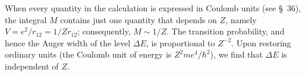 When every quantity in the calculation is expressed in Coulomb units (see \S~36), the integral $M$ contains just one quantity that depends on $Z$, namely $V=e^2/r_{12}=1/Zr_{12}$; consequently, $M\sim1/Z$. The transition probability, and hence the Auger width of the level $\Delta E$, is proportional to $Z^{-2}$. Upon restoring ordinary units (the Coulomb unit of energy is $Z^2me^4/\hbar^2$), we find that $\Delta E$ is independent of $Z$.

